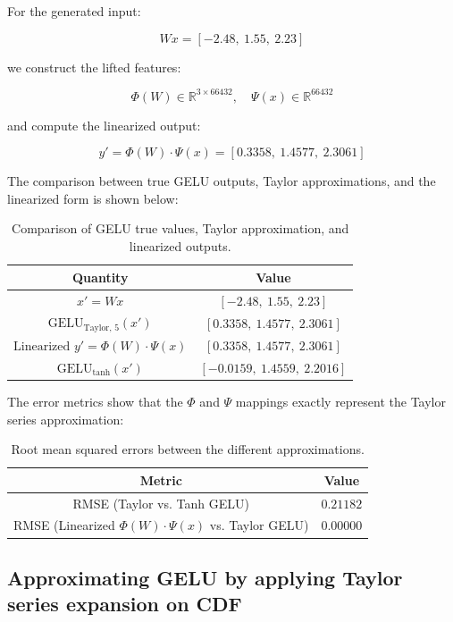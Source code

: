 \documentclass{article}
\begin{document}
For the generated input:

\[
W x = [-2.48,\ 1.55,\ 2.23]
\]

we construct the lifted features:

\[
\Phi(W) \in \mathbb{R}^{3 \times 66432}, \quad \Psi(x) \in \mathbb{R}^{66432}
\]

and compute the linearized output:

\[
y' = \Phi(W) \cdot \Psi(x) = [0.3358,\ 1.4577,\ 2.3061]
\]

The comparison between true GELU outputs, Taylor approximations, and the linearized form is shown below:

\begin{table}[h!]
\centering
\begin{tabular}{|c|c|}
\hline
\textbf{Quantity} & \textbf{Value} \\ \hline
\( x' = W x \) & \([-2.48,\ 1.55,\ 2.23]\) \\ \hline
\( \text{GELU}_{\text{Taylor, 5}}(x') \) & \([0.3358,\ 1.4577,\ 2.3061]\) \\ \hline
\( \text{Linearized } y' = \Phi(W) \cdot \Psi(x) \) & \([0.3358,\ 1.4577,\ 2.3061]\) \\ \hline
\( \text{GELU}_{\tanh}(x') \) & \([-0.0159,\ 1.4559,\ 2.2016]\) \\ \hline
\end{tabular}
\caption{Comparison of GELU true values, Taylor approximation, and linearized outputs.}
\end{table}

The error metrics show that the $\Phi$ and $\Psi$ mappings exactly represent the Taylor series approximation:

\begin{table}[h!]
\centering
\begin{tabular}{|c|c|}
\hline
\textbf{Metric} & \textbf{Value} \\ \hline
RMSE (Taylor vs. Tanh GELU) & \(0.21182\) \\ \hline
RMSE (Linearized \( \Phi(W) \cdot \Psi(x) \) vs. Taylor GELU) & \(0.00000\) \\ \hline
\end{tabular}
\caption{Root mean squared errors between the different approximations.}
\end{table}

\subsection{Approximating GELU by applying Taylor series expansion on CDF}
\end{document}
